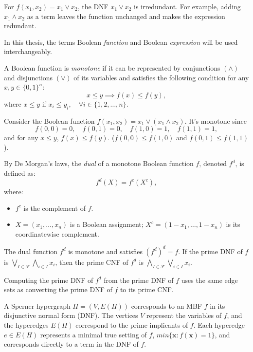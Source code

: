 \begin{example}
For $f(x_1,x_2)=x_1\vee x_2$, the DNF $x_1\vee x_2$ is irredundant. For example, adding $x_1\wedge x_2$ as a term leaves the function unchanged and makes the expression redundant.
\end{example}
\noindent In this thesis, the terms Boolean \emph{function} and Boolean \emph{expression} will be used interchangeably.

\begin{definition}
A Boolean function is \emph{monotone} if it can be represented by conjunctions $(\wedge)$ and disjunctions $(\vee)$ of its variables and satisfies the following condition for any $x,y\in\{0,1\}^n$:
\[
x\leq y\implies f(x)\leq f(y),
\]
where $x\leq y$ if $x_i\leq y_i,\quad\forall i\in\{1,2,\dots,n\}$.
\end{definition}

\begin{example}
Consider the Boolean function $f(x_1,x_2)=x_1\vee(x_1\wedge x_2)$. It's monotone since
\[
f(0,0)=0,\quad f(0,1)=0,\quad f(1,0)=1,\quad f(1,1)=1,
\]
and for any $x\leq y$, $f(x)\leq f(y)$. ($f(0,0)\leq f(1,0)$ and $f(0,1)\leq f(1,1)$).
\end{example}

\begin{definition}
By De Morgan's laws, the \emph{dual} of a monotone Boolean function $f$, denoted $f^d$, is defined as:
\[
f^d(X)=f^c(X^c),
\]
where:
\begin{itemize}
\item $f^c$ is the complement of $f$.
\item $X=(x_1,\ldots,x_n)$ is a Boolean assignment; $X^c=(1-x_1,\ldots,1-x_n)$ is its coordinatewise complement.
\end{itemize}
\end{definition}

The dual function $f^d$ is monotone and satisfies $(f^d)^d=f$. If the prime DNF of $f$ is $\bigvee_{I\in\mathcal{F}}\bigwedge_{i\in I}x_i$, then the prime CNF of $f^d$ is $\bigwedge_{I\in\mathcal{F}}\bigvee_{i\in I}x_i$.

Computing the prime DNF of $f^d$ from the prime DNF of $f$ uses the same edge sets as converting the prime DNF of $f$ to its prime CNF.

A Sperner hypergraph $H=(V,E(H))$ corresponds to an MBF $f$ in its disjunctive normal form (DNF). The vertices $V$ represent the variables of $f$, and the hyperedges $E(H)$ correspond to the prime implicants of $f$. Each hyperedge $e\in E(H)$ represents a minimal true setting of $f$, $min\{\mathbf{x}:f(\mathbf{x})=1\}$, and corresponds directly to a term in the DNF of $f$.

